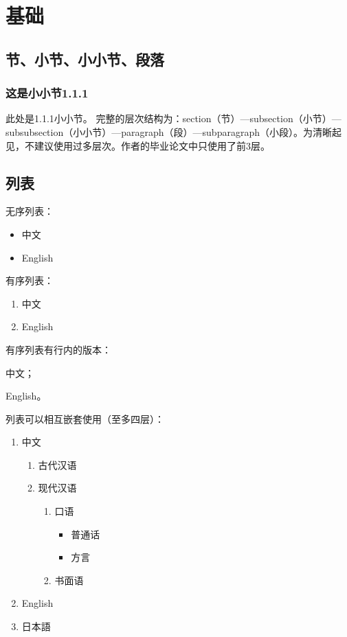 \documentclass[zihao = -4, linespread = 1.5]{ctexart} %
\begin{document}
\tableofcontents

\newpage

\section{基础}\label{sec:fundamental}
\subsection{节、小节、小小节、段落}
\subsubsection{这是小小节1.1.1}
此处是1.1.1小小节。
完整的层次结构为：section（节）---subsection（小节）---subsubsection（小小节）---paragraph（段）---subparagraph（小段）。为清晰起见，不建议使用过多层次。作者的毕业论文中只使用了前3层。
\subsection{列表}
无序列表：
\begin{itemize}
  \item 中文
  \item English
\end{itemize}

有序列表：
\begin{enumerate}
  \item 中文
  \item English
\end{enumerate}

有序列表有行内的版本：\begin{enumerate*}[label=(\arabic*)]
\item 中文；
\item English。
\end{enumerate*}


列表可以相互嵌套使用（至多四层）：
\begin{enumerate}
  \item 中文
  \begin{enumerate}
    \item 古代汉语
    \item 现代汉语
    \begin{enumerate}
      \item 口语
      \begin{itemize}
        \item 普通话
        \item 方言
      \end{itemize}
      \item 书面语
    \end{enumerate}
  \end{enumerate}
  \item English
  \item 日本語
\end{enumerate}
\end{document}
